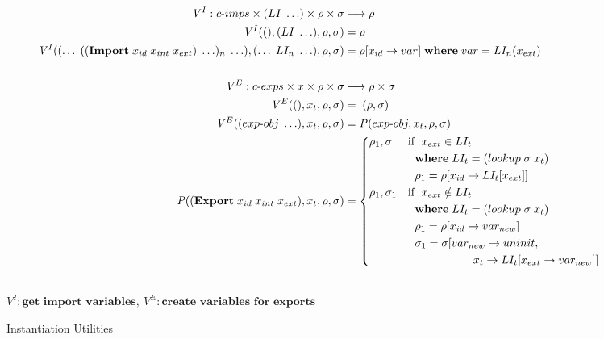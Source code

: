 \documentclass[sigplan,screen,anonymous]{acmart}
\def\dash {\text{-}}
\begin{document}
\newcommand{\runio}[1]{run\dash prog(#1, \rho, \sigma)\;}
\newcommand{\prog}[2]{(\textbf{program}\; (\textbf{use\dash linklets}\;#1 )\;#2)}
\def\transrel {&\twoheadrightarrow_{p}\;}

\begin{figure*}[tbp]
  \begin{align*}
    \mathit{V}^I : c\dash imps \times (LI\;\ldots) \times \rho \times \sigma &\longrightarrow \rho \\
    \mathit{V}^I((), (LI\;\ldots), \rho, \sigma) &= \rho \\
    \mathit{V}^I((\ldots\;((\textbf{Import}\; x_{id}\;x_{int}\;x_{ext})\;\ldots)_n\;\ldots), (\ldots\;LI_n\;\ldots), \rho, \sigma) &= \rho[x_{id}\rightarrow var]\; \where var = LI_n(x_{ext}) \\ \\
    \mathit{V}^E : c\dash exps \times x \times \rho \times \sigma &\longrightarrow \rho \times \sigma \\
    \mathit{V}^E((), x_t, \rho, \sigma) &=\; (\rho, \sigma) \\
    \mathit{V}^E((exp\dash obj\;\ldots), x_t, \rho, \sigma) &= \mathit{P}(exp\dash obj, x_t, \rho, \sigma)\\
    \mathit{P}((\textbf{Export}\;x_{id}\;x_{int}\;x_{ext}), x_t, \rho, \sigma) &= \begin{cases*}
      \rho_1, \sigma & if $\;x_{ext} \in LI_t$ \\
      \;        &\; \where $LI_t = (lookup\; \sigma\; x_t)$ \\
      \;        &\; $\rho_1 = \rho[x_{id}\rightarrow LI_t[x_{ext}]]$ \\
        \rho_1, \sigma_1 & if $\;x_{ext} \notin LI_t$\\
        \;        &\; \where $LI_t = (lookup\; \sigma\; x_t)$ \\
        \;        &\; $\rho_1 = \rho[x_{id}\rightarrow var_{new}]$ \\
        \;        &\; $\sigma_1 = \sigma[var_{new}\rightarrow uninit,$ \\
        \;        &\; \hspace{1.7cm} $x_t\rightarrow LI_t[x_{ext}\rightarrow var_{new}]]$ \\
    \end{cases*} \\ \\
  \end{align*}
  \hfill \footnotesize $\mathit{V}^I : \textbf{get  import variables},\: \mathit{V}^E : \textbf{create variables for exports}$
\caption{Instantiation Utilities}
\label{fig:inst-utils}
\end{figure*}
\end{document}
